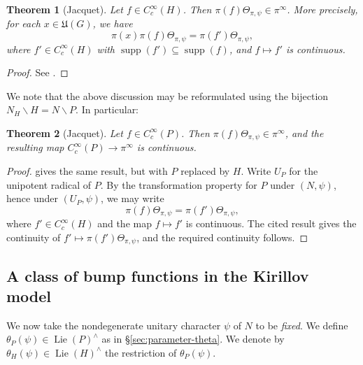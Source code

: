 \documentclass[reqno]{amsart}
\DeclareMathOperator{\Lie}{Lie}
\DeclareMathOperator{\supp}{supp}
\theoremstyle{plain} \newtheorem{theorem} {Theorem}
\theoremstyle{definition} \newtheorem{definition} [theorem] {Definition}
\theoremstyle{itplain} %
\numberwithin{equation}{section}
\numberwithin{theorem}{section}
\begin{document}
\begin{theorem}[Jacquet]\label{thm:jacquet-on-kirillov-model}
  Let $f \in C_c^\infty(H)$.  Then $\pi(f) \Theta_{\pi,\psi} \in \pi^\infty$.  More precisely, for each $x \in \mathfrak{U}(G)$, we have
  \begin{equation}\label{eqn:pi-x-pi-f-Theta-pi-f-prime}
    \pi(x) \pi(f) \Theta_{\pi,\psi} = \pi(f') \Theta_{\pi,\psi},
  \end{equation}
  where $f' \in C_c^\infty(H)$ with $\supp(f') \subseteq \supp(f)$, and $f \mapsto f'$ is continuous.
\end{theorem}
\begin{proof}
  See \cite[\S3.2]{MR2733072}.  
\end{proof}

We note that the above discussion may be reformulated using the bijection $N_H \backslash H = N \backslash P$.  In particular:
\begin{theorem}[Jacquet]\label{thm:jacquet-on-kirillov-model-P}
  Let $f \in C_c^\infty(P)$.  Then $\pi(f) \Theta_{\pi,\psi} \in \pi^\infty$, and the resulting map $C_c^\infty(P) \rightarrow \pi^\infty$ is continuous.
\end{theorem}
\begin{proof}
  \cite[Prop 4]{MR2733072} gives the same result, but with $P$ replaced by $H$.  Write $U_P$ for the unipotent radical of $P$.  By the transformation property for $P$ under $(N,\psi)$, hence under $(U_P,\psi)$, we may write
  \begin{equation*}
    \pi(f) \Theta_{\pi,\psi} = \pi(f ') \Theta_{\pi,\psi},
  \end{equation*}
  where $f' \in C_c^\infty(H)$ and the map $f \mapsto f'$ is continuous.  The cited result gives the continuity of $f' \mapsto \pi (f') \Theta_{\pi,\psi}$, and the required continuity follows.
\end{proof}



\subsection{A class of bump functions in the Kirillov model}\label{sec:class-bump-functions}
We now take the nondegenerate unitary character $\psi$ of $N$ to be \emph{fixed}.  We define $\theta_P(\psi) \in \Lie(P)^\wedge$ as in \S\ref{sec:parameter-theta}.  We denote by $\theta_H(\psi) \in \Lie(H)^\wedge$ the restriction of $\theta_P(\psi)$.   
\end{document}
